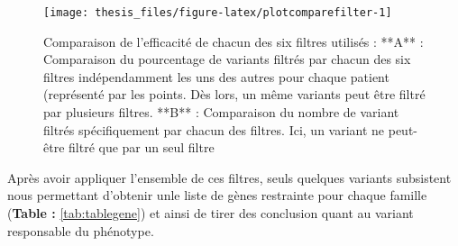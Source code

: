 \documentclass[12pt,twoside]{reedthesis}
\theoremstyle{definition}
\theoremstyle{definition}
\theoremstyle{remark}
\begin{document}
  \newpage
  
  \begin{figure}
  
  {\centering \texttt{[image: thesis\_files/figure-latex/plotcomparefilter-1]} 
  
  }
  
  \caption[Comparaison de l'efficacité de chacun des six filtres utilisés]{Comparaison de l'efficacité de chacun des six filtres utilisés : **A** : Comparaison du pourcentage de variants filtrés par chacun des six filtres indépendamment les uns des autres pour chaque patient (représenté par les points. Dès lors, un même variants peut être filtré par plusieurs filtres. **B** : Comparaison du nombre de variant filtrés spécifiquement par chacun des filtres. Ici, un variant ne peut-être filtré que par un seul filtre}\label{fig:plotcomparefilter}
  \end{figure}
  
  \newpage
  
  Après avoir appliquer l'ensemble de ces filtres, seuls quelques variants
  subsistent nous permettant d'obtenir unle liste de gènes restrainte pour
  chaque famille (\textbf{Table : }\ref{tab:tablegene}) et ainsi de tirer
  des conclusion quant au variant responsable du phénotype.
  
\end{document}

